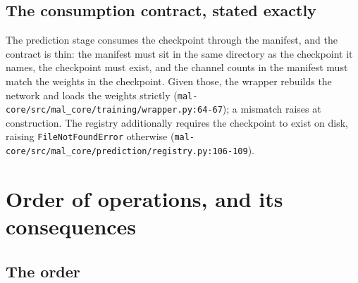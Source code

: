 \documentclass[11pt,a4paper]{article}
\newcommand{\codex}[1]{\texttt{#1}}
\begin{document}
\subsection{The consumption contract, stated exactly}

The prediction stage consumes the checkpoint through the manifest, and the
contract is thin: the manifest must sit in the same directory as the
checkpoint it names, the checkpoint must exist, and the channel counts in the
manifest must match the weights in the checkpoint. Given those, the wrapper
rebuilds the network and loads the weights strictly
(\codex{mal-core/\allowbreak{}src/\allowbreak{}mal\_\allowbreak{}core/\allowbreak{}training/\allowbreak{}wrapper.py:64-67}); a mismatch raises at
construction. The registry additionally requires the checkpoint to exist on
disk, raising \codex{FileNotFoundError} otherwise
(\codex{mal-core/\allowbreak{}src/\allowbreak{}mal\_\allowbreak{}core/\allowbreak{}prediction/\allowbreak{}registry.py:106-109}).

\section{Order of operations, and its consequences}

\subsection{The order}
\end{document}
